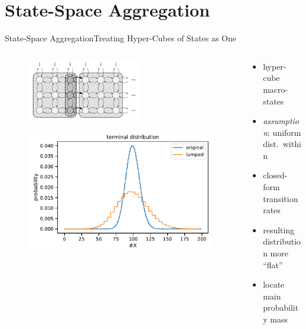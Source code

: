 \documentclass{beamer}
\begin{document}
\section{State-Space Aggregation}
\begin{frame}{State-Space Aggregation}{Treating Hyper-Cubes of States as One}
    \begin{columns}
        \begin{column}{.4\textwidth}
            \begin{figure}
            \includegraphics[width=5cm]{../gfx/macro_states.pdf}
            \end{figure}
            \begin{figure}
                \includegraphics[scale=.3]{../gfx/lumped_dist.pdf}
            \end{figure}
        \end{column}
        \begin{column}{.6\textwidth}
            \begin{itemize}
                \item hyper-cube macro-states
                \item \emph{assumption}: uniform dist.\ within
                \item closed-form transition rates
            \end{itemize}
            \vspace{17mm}
            \begin{itemize}
                \item resulting distribution more ``flat''
                \item locate main probability mass
            \end{itemize}
            \vspace{4mm}
        \end{column}
    \end{columns}
\end{frame}
\end{document}
